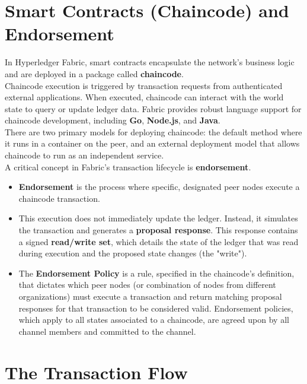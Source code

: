 \documentclass{scrbook}
\begin{document}
\section{Smart Contracts (Chaincode) and Endorsement}

In Hyperledger Fabric, smart contracts encapsulate the network's business logic and are deployed in a package called \textbf{chaincode}.\\

Chaincode execution is triggered by transaction requests from authenticated external applications. When executed, chaincode can interact with the world state to query or update ledger data. Fabric provides robust language support for chaincode development, including \textbf{Go}, \textbf{Node.js}, and \textbf{Java}.\\

There are two primary models for deploying chaincode: the default method where it runs in a container on the peer, and an external deployment model that allows chaincode to run as an independent service.\\

A critical concept in Fabric's transaction lifecycle is \textbf{endorsement}.

\begin{itemize}
    \item \textbf{Endorsement} is the process where specific, designated peer nodes execute a chaincode transaction.
    
    \item This execution does not immediately update the ledger. Instead, it simulates the transaction and generates a \textbf{proposal response}. This response contains a signed \textbf{read/write set}, which details the state of the ledger that was read during execution and the proposed state changes (the "write").
    
    \item The \textbf{Endorsement Policy} is a rule, specified in the chaincode's definition, that dictates which peer nodes (or combination of nodes from different organizations) must execute a transaction and return matching proposal responses for that transaction to be considered valid. Endorsement policies, which apply to all states associated to a chaincode, are agreed upon by all channel members and committed to the channel.
\end{itemize}

\section{The Transaction Flow}
\end{document}
